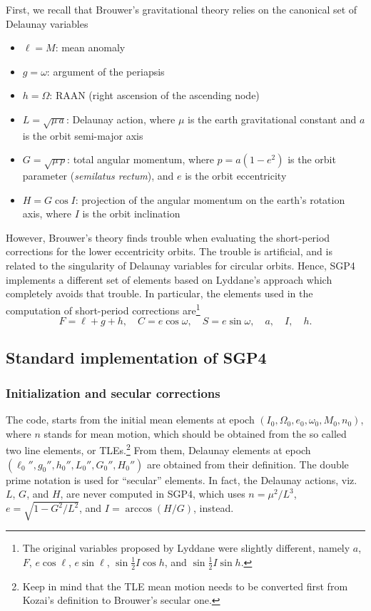\documentclass{article}
\begin{document}
First, we recall that Brouwer's gravitational theory relies on the canonical set of Delaunay variables
\begin{itemize} \itemsep0em
\item $\ell=M$: mean anomaly
\item $g=\omega$: argument of the periapsis
\item $h=\Omega$: RAAN (right ascension of the ascending node)
\item $L=\sqrt{\mu\,a}$: Delaunay action, where $\mu$ is the earth gravitational constant and $a$ is the orbit semi-major axis
\item $G=\sqrt{\mu\,p}$: total angular momentum, where $p=a(1-e^2)$ is the orbit parameter (\textit{semilatus rectum}), and $e$ is the orbit eccentricity
\item $H=G\cos{I}$: projection of the angular momentum on the earth's rotation axis, where $I$ is the orbit inclination
\end{itemize}
However, Brouwer's theory finds trouble when evaluating the short-period corrections for the lower eccentricity orbits. The trouble is artificial, and is related to the singularity of Delaunay variables for circular orbits. Hence,
SGP4 implements a different set of elements based on Lyddane's approach which completely avoids that trouble. In particular, the elements used in the computation of short-period corrections are\footnote{The original variables proposed by Lyddane were slightly different, namely $a$, $F$, $e\cos\ell$, $e\sin\ell$, $\sin\frac{1}{2}I\cos{h}$, and $\sin\frac{1}{2}I\sin{h}$. }
\[
F=\ell+g+h, \quad C=e\cos\omega, \quad S=e\sin\omega, \quad a, \quad I, \quad h.
\]

\subsection{Standard implementation of SGP4} \label{sec:vallado}

\subsubsection{Initialization and secular corrections}
The code, starts from the initial mean elements at epoch $(I_0,\Omega_0,e_0,\omega_0,M_0,n_0)$, where $n$ stands for mean motion, which should be obtained from the so called two line elements, or TLEs.\footnote{Keep in mind that the TLE mean motion needs to be converted first from Kozai's definition \cite{Kozai1959} to Brouwer's secular one.} From them, Delaunay elements at epoch $(\ell_0'',g_0'', h_0'',L_0'',G_0'',H_0'')$ are obtained from their definition. The double prime notation is used for ``secular'' elements. In fact, the Delaunay actions, viz.~$L$, $G$, and $H$, are never computed in SGP4, which uses $n=\mu^2/L^3$, $e=\sqrt{1-G^2/L^2}$, and $I=\arccos(H/G)$, instead.
\end{document}
